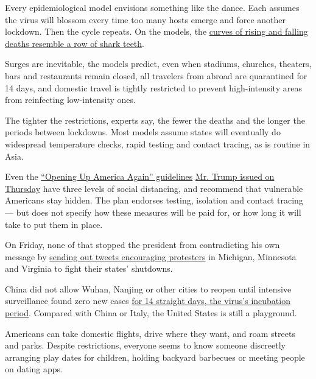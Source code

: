 Every epidemiological model envisions something like the dance. Each
assumes the virus will blossom every time too many hosts emerge and
force another lockdown. Then the cycle repeats. On the models, the
\href{https://www.imperial.ac.uk/media/imperial-college/medicine/sph/ide/gida-fellowships/Imperial-College-COVID19-NPI-modelling-16-03-2020.pdf}{curves
of rising and falling deaths resemble a row of shark teeth}.

Surges are inevitable, the models predict, even when stadiums, churches,
theaters, bars and restaurants remain closed, all travelers from abroad
are quarantined for 14 days, and domestic travel is tightly restricted
to prevent high-intensity areas from reinfecting low-intensity ones.

The tighter the restrictions, experts say, the fewer the deaths and the
longer the periods between lockdowns. Most models assume states will
eventually do widespread temperature checks, rapid testing and contact
tracing, as is routine in Asia.

Even the \href{https://www.whitehouse.gov/openingamerica/}{``Opening Up
America Again'' guidelines}
\href{https://www.nytimes3xbfgragh.onion/2020/04/16/us/politics/coronavirus-trump-guidelines.html}{Mr.
Trump issued on Thursday} have three levels of social distancing, and
recommend that vulnerable Americans stay hidden. The plan endorses
testing, isolation and contact tracing --- but does not specify how
these measures will be paid for, or how long it will take to put them in
place.

On Friday, none of that stopped the president from contradicting his own
message by
\href{https://www.nytimes3xbfgragh.onion/2020/04/17/us/coronavirus-cases-news-update.html\#link-23cd1c40}{sending
out tweets encouraging protesters} in Michigan, Minnesota and Virginia
to fight their states' shutdowns.

China did not allow Wuhan, Nanjing or other cities to reopen until
intensive surveillance found zero new cases
\href{https://www.cnn.com/2020/03/24/asia/coronavirus-wuhan-lockdown-lifted-intl-hnk/index.html}{for
14 straight days, the virus's incubation period}. Compared with China or
Italy, the United States is still a playground.

Americans can take domestic flights, drive where they want, and roam
streets and parks. Despite restrictions, everyone seems to know someone
discreetly arranging play dates for children, holding backyard barbecues
or meeting people on dating apps.

